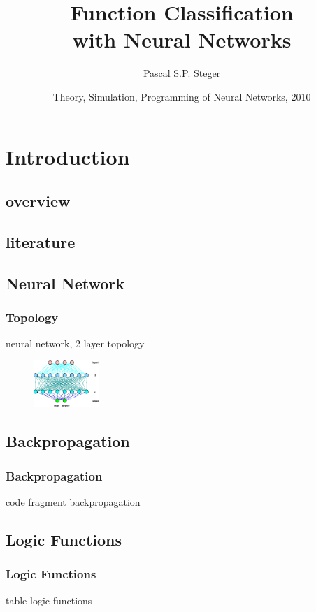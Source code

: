 \documentclass{beamer}
\title{Function Classification \\with Neural Networks}
\author{Pascal S.P. Steger}
\date[10. 08. 2010]{Theory, Simulation, Programming of Neural Networks, 2010}
\begin{document}
%
\begin{frame}
    \titlepage
\end{frame}
%
%
\section{Introduction}
%
\subsection{overview}
\begin{frame}
    \tableofcontents
\end{frame}
%
\subsection{literature}
\begin{frame}
    
    
	\hfill\vfill
	\cite{Jones1990}
	\cite{Laemmel2004}
	\cite{Rojas1996}
	\cite{Stoop2010}

\end{frame}
%

\subsection{Neural Network}
\begin{frame}
\frametitle{Topology}
neural network, 2 layer topology
	\begin{figure}
		\centering
		\includegraphics[width=2.5cm]{fig/network_topology.eps}
	\end{figure}
\end{frame}

\subsection{Backpropagation}
\begin{frame}
\frametitle{Backpropagation}
code fragment backpropagation
\end{frame}

\subsection{Logic Functions}
\begin{frame}
\frametitle{Logic Functions}
table logic functions
\end{frame}
\end{document}

